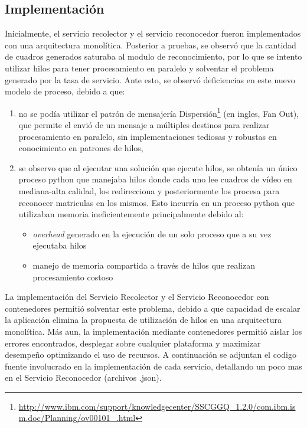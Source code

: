 \subsection{Implementación}

Inicialmente, el servicio recolector y el servicio reconocedor fueron implementados con una arquitectura monolítica. Posterior a pruebas, se observó que la cantidad de cuadros generados saturaba al modulo de reconocimiento, por lo que se intento utilizar hilos para tener procesamiento en paralelo y solventar el problema generado por la tasa de servicio. Ante esto, se observó deficiencias en este nuevo modelo de proceso, debido a que:
\pagebreak
\begin{enumerate}
\item no se podía utilizar el patrón de mensajería Dispersión\footnote{\url{http://www.ibm.com/support/knowledgecenter/SSCGGQ_1.2.0/com.ibm.ism.doc/Planning/ov00101_.html}} (en ingles, Fan Out), que permite el envió de un mensaje a múltiples destinos para realizar procesamiento en paralelo, sin implementaciones tediosas y robustas en conocimiento en patrones de hilos, 
\item se observo que al ejecutar una solución que ejecute hilos, se obtenía un único proceso python que manejaba hilos donde cada uno lee cuadros de vídeo en mediana-alta calidad, los redirecciona y posteriormente los procesa para reconocer matriculas en los mismos. Esto incurría en un proceso python que utilizaban memoria ineficientemente principalmente debido al:
    \begin{itemize}
    \item \textit{overhead} generado en la ejecución de un solo proceso que a su vez ejecutaba hilos 
    \item manejo de memoria compartida a través de hilos que realizan procesamiento costoso 
    \end{itemize}
\end{enumerate}

La implementación del Servicio Recolector y el Servicio Reconocedor con contenedores permitió solventar este problema, debido a que capacidad de escalar la aplicación elimina la propuesta de utilización de hilos en una arquitectura monolítica. 
Más aun, la implementación mediante contenedores permitió aislar los errores encontrados, desplegar sobre cualquier plataforma y maximizar desempeño optimizando el uso de recursos. A continuación se adjuntan el codigo fuente involucrado en la implementación de cada servicio, detallando un poco mas en el Servicio Reconocedor (archivos .json).
